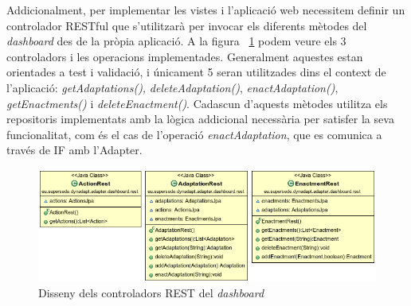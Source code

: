 Addicionalment, per implementar les vistes i l'aplicació web necessitem definir un controlador RESTful que s'utilitzarà per invocar els diferents mètodes del \textit{dashboard} des de la pròpia aplicació. A la figura ~\ref{fig:Figura35} podem veure els 3 controladors i les operacions implementades. Generalment aquestes estan orientades a test i validació, i únicament 5 seran utilitzades dins el context de l'aplicació: \textit{getAdaptations(),} \textit{deleteAdaptation()}, \textit{enactAdaptation()}, \textit{getEnactments()} i \textit{deleteEnactment()}. Cadascun d'aquests mètodes utilitza els repositoris implementats amb la lògica addicional necessària per satisfer la seva funcionalitat, com és el cas de l'operació \textit{enactAdaptation}, que es comunica a través de IF amb l'Adapter.

\begin{figure}
\centering
\includegraphics[width=14cm]{Figures/Figure35}
\decoRule
\caption{Disseny dels controladors REST del \textit{dashboard}}
\label{fig:Figura35}
\end{figure} 